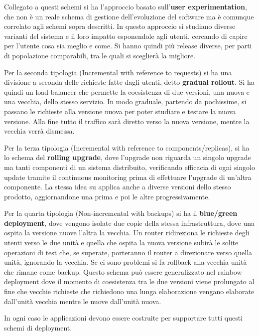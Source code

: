 Collegato a questi schemi si ha l'approccio basato sull'\textbf{user experimentation},
che non è un reale schema di gestione dell'evoluzione del software ma è comunque correlato
agli schemi sopra descritti. In questo approccio si studiano diverse varianti del
sistema e il loro impatto esponendole agli utenti, cercando di capire per l'utente
cosa sia meglio e come. Si hanno quindi più release diverse, per parti di
popolazione comparabili, tra le quali si sceglierà la migliore.

Per la seconda tipologia (Incremental with reference to requests) si ha una
divisione a seconda delle richieste fatte dagli utenti, detto \textbf{gradual rollout}.
Si ha quindi un load balancer che permette la coesistenza di due versioni, una
nuova e una vecchia, dello stesso servizio. In modo graduale, partendo da pochissime,
si passano le richieste alla versione nuova per poter studiare e testare la nuova
versione. Alla fine tutto il traffico sarà diretto verso la nuova versione, mentre
la vecchia verrà dismessa.

Per la terza tipologia (Incremental with reference to components/replicas),
si ha lo schema del \textbf{rolling upgrade}, dove l'upgrade non riguarda un
singolo upgrade ma tanti componenti di un sistema distribuito, verificando efficacia
di ogni singolo update tramite il continuous monitoring prima di effettuare l'upgrade
di un'altra componente. La stessa idea su applica anche a diverse versioni dello
stesso prodotto, aggiornandone una prima e poi le altre progressivamente.

Per la quarta tipologia (Non-incremental with backups) si ha il
\textbf{blue/green deployment}, dove vengono isolate due copie della stessa
infrastruttura, dove una ospita la versione nuove l'altra la vecchia. Un router
ridireziona le richieste degli utenti verso le due unità e quella che ospita la
nuova versione subirà le solite operazioni di test che, se superate, porteranno
il router a direzionare verso quella unità, ignorando la vecchia. Se ci sono problemi
si fa rollback alla vecchia unità che rimane come backup. Questo schema può essere
generalizzato nel rainbow deployment dove il momento di coesistenza tra le due
versioni viene prolungato al fine che vecchie richieste che richiedono una lunga
elaborazione vengano elaborate dall'unità vecchia mentre le nuove dall'unità nuova.

In ogni caso le applicazioni devono essere costruite per supportare tutti questi
schemi di deployment.
